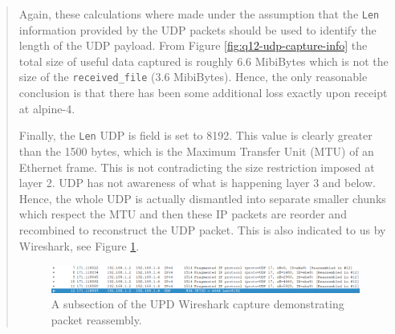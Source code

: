 \documentclass{article}
\newenvironment{ans}
{\fbox{Answer}\begin{quote}\nopagebreak}
{\end{quote}}
\begin{document}
\begin{ans}
Again, these calculations where made under the assumption
that the \texttt{Len} information provided by the UDP
packets should be used to identify the length of the UDP
payload. From Figure \ref{fig:q12-udp-capture-info} the
total size of useful data captured is roughly 6.6 MibiBytes
which is not the size of the \texttt{received\_file} (3.6
MibiBytes). Hence, the only reasonable conclusion is that
there has been some additional loss exactly upon receipt at
alpine-4.

Finally, the \texttt{Len} UDP is field is set to 8192. This
value is clearly greater than the 1500 bytes, which is the
Maximum Transfer Unit (MTU) of an Ethernet frame. This is
not contradicting the size restriction imposed at layer 2.
UDP has not awareness of what is happening layer 3 and
below. Hence, the whole UDP is actually dismantled into
separate smaller chunks which respect the MTU and then
these IP packets are reorder and recombined to reconstruct
the UDP packet. This is also indicated to us by Wireshark,
see Figure \ref{fig:q12-udp-packet-reassembly}.

\begin{figure}[H]
\centering
\includegraphics[width=16cm]{data/ip-reconstruction.png}
\caption{A subsection of the UPD Wireshark capture demonstrating packet
reassembly.}
\label{fig:q12-udp-packet-reassembly}
\end{figure}
\end{ans}
\end{document}
